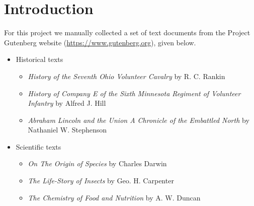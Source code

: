 \documentclass[fleqn,10pt]{../SelfArx} %
\affiliation{\textsuperscript{1}\textit{Department of Applied Mathematics, University of Washington, Seattle}} %
\begin{document}
\flushbottom %

\maketitle %

\tableofcontents %



\section{Introduction}
\label{sec:introduction}
For this project we manually collected a set of text documents from the Project 
Gutenberg website (\url{https://www.gutenberg.org}), given below.

\begin{itemize}
\item Historical texts
	\begin{itemize}
		\item \textit{History of the Seventh Ohio Volunteer Cavalry} by R. C. Rankin
		\item \textit{History of Company E of the Sixth Minnesota Regiment of Volunteer Infantry} by Alfred J. Hill
		\item \textit{Abraham Lincoln and the Union A Chronicle of the Embattled North} by Nathaniel W. Stephenson
	\end{itemize}

\item Scientific texts
	\begin{itemize}
		\item \textit{On The Origin of Species} by Charles Darwin
		\item \textit{The Life-Story of Insects} by Geo. H. Carpenter
		\item \textit{The Chemistry of Food and Nutrition} by A. W. Duncan
	\end{itemize}
\end{itemize}
\end{document}
